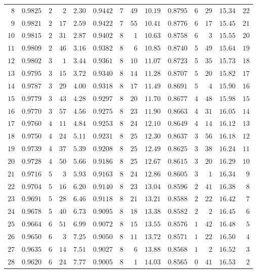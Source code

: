 \begin{center}
\begin{tabular}{r||r|rr|r||r|rr|r||r|rr|r||r}
$8$&$0.9825$&$2$&$2$&$2.30$&$0.9442$&$7$&$49$&$10.19$&$0.8795$&$6$&$29$&$15.34$&$22$\\
$9$&$0.9821$&$2$&$17$&$2.59$&$0.9422$&$7$&$55$&$10.41$&$0.8776$&$6$&$17$&$15.45$&$21$\\
$10$&$0.9815$&$2$&$31$&$2.87$&$0.9402$&$8$&$1$&$10.63$&$0.8758$&$6$&$3$&$15.55$&$20$\\[3pt]
$11$&$0.9809$&$2$&$46$&$3.16$&$0.9382$&$8$&$6$&$10.85$&$0.8740$&$5$&$49$&$15.64$&$19$\\
$12$&$0.9802$&$3$&$1$&$3.44$&$0.9361$&$8$&$10$&$11.07$&$0.8723$&$5$&$35$&$15.73$&$18$\\
$13$&$0.9795$&$3$&$15$&$3.72$&$0.9340$&$8$&$14$&$11.28$&$0.8707$&$5$&$20$&$15.82$&$17$\\
$14$&$0.9787$&$3$&$29$&$4.00$&$0.9318$&$8$&$17$&$11.49$&$0.8691$&$5$&$4$&$15.90$&$16$\\
$15$&$0.9779$&$3$&$43$&$4.28$&$0.9297$&$8$&$20$&$11.70$&$0.8677$&$4$&$48$&$15.98$&$15$\\[3pt]
$16$&$0.9770$&$3$&$57$&$4.56$&$0.9275$&$8$&$23$&$11.90$&$0.8663$&$4$&$31$&$16.05$&$14$\\
$17$&$0.9760$&$4$&$11$&$4.84$&$0.9253$&$8$&$24$&$12.10$&$0.8649$&$4$&$14$&$16.12$&$13$\\
$18$&$0.9750$&$4$&$24$&$5.11$&$0.9231$&$8$&$25$&$12.30$&$0.8637$&$3$&$56$&$16.18$&$12$\\
$19$&$0.9739$&$4$&$37$&$5.39$&$0.9208$&$8$&$25$&$12.49$&$0.8625$&$3$&$38$&$16.24$&$11$\\
$20$&$0.9728$&$4$&$50$&$5.66$&$0.9186$&$8$&$25$&$12.67$&$0.8615$&$3$&$20$&$16.29$&$10$\\[3pt]
$21$&$0.9716$&$5$&$3$&$5.93$&$0.9163$&$8$&$24$&$12.86$&$0.8605$&$3$&$1$&$16.34$&$9$\\
$22$&$0.9704$&$5$&$16$&$6.20$&$0.9140$&$8$&$23$&$13.04$&$0.8596$&$2$&$41$&$16.38$&$8$\\
$23$&$0.9691$&$5$&$28$&$6.46$&$0.9118$&$8$&$21$&$13.21$&$0.8588$&$2$&$22$&$16.42$&$7$\\
$24$&$0.9678$&$5$&$40$&$6.73$&$0.9095$&$8$&$18$&$13.38$&$0.8582$&$2$&$2$&$16.45$&$6$\\
$25$&$0.9664$&$6$&$51$&$6.99$&$0.9072$&$8$&$15$&$13.55$&$0.8576$&$1$&$42$&$16.48$&$5$\\[3pt]
$26$&$0.9650$&$6$&$3$&$7.25$&$0.9050$&$8$&$11$&$13.72$&$0.8571$&$1$&$22$&$16.50$&$4$\\
$27$&$0.9635$&$6$&$14$&$7.51$&$0.9027$&$8$&$6$&$13.88$&$0.8568$&$1$&$2$&$16.52$&$3$\\
$28$&$0.9620$&$6$&$24$&$7.77$&$0.9005$&$8$&$1$&$14.03$&$0.8565$&$0$&$41$&$16.53$&$2$\\

\end{tabular}
\end{center}
